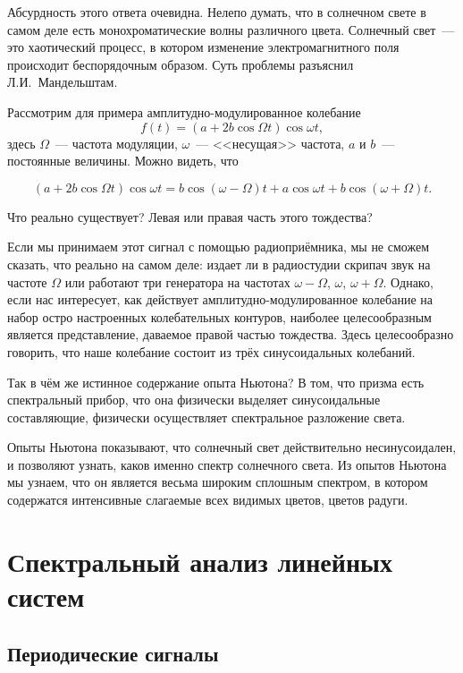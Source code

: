 Абсурдность этого ответа очевидна. Нелепо думать, что в солнечном свете в самом деле есть монохроматические волны различного цвета. Солнечный свет~--- это хаотический процесс, в котором изменение электромагнитного поля происходит беспорядочным образом. Суть проблемы разъяснил Л.И.~Мандельштам.

Рассмотрим для примера амплитудно-модулированное колебание
\begin{equation*}
	f(t)=(a+2b\cos\Omega t)\cos\omega t,
\end{equation*}
%
здесь $\Omega$~--- частота модуляции, $\omega$~--- <<несущая>> частота, $a$ и $b$~--- постоянные величины. Можно видеть,
что

\begin{equation*}
	(a+2b\cos\Omega t)\cos\omega t=b\cos(\omega-\Omega)t+a\cos\omega t+b\cos(\omega+\Omega)t.
\end{equation*}

Что реально существует? Левая или правая часть этого тождества?

Если мы принимаем этот сигнал с помощью радиоприёмника, мы не сможем сказать, что реально на самом деле: издает ли в радиостудии скрипач звук на частоте $\Omega$ или работают три генератора на частотах $\omega-\Omega$, $\omega$, $\omega+\Omega$. Однако, если нас интересует, как действует амплитудно-модулированное колебание на набор остро настроенных колебательных контуров, наиболее целесообразным является представление, даваемое правой частью тождества. Здесь целесообразно говорить, что наше колебание состоит из трёх синусоидальных колебаний.

Так в чём же истинное содержание опыта Ньютона? В том, что призма есть спектральный прибор, что она физически выделяет синусоидальные составляющие, физически осуществляет спектральное разложение света.

Опыты Ньютона показывают, что солнечный свет действительно несинусоидален, и позволяют узнать, каков именно спектр солнечного света. Из опытов Ньютона мы узнаем, что он является весьма широким сплошным спектром, в котором содержатся интенсивные слагаемые всех видимых цветов, цветов радуги.

\section{Спектральный анализ линейных систем}
\subsection{Периодические сигналы}

